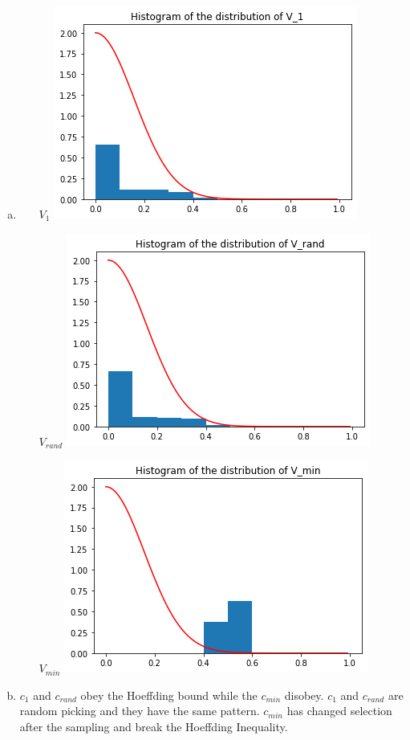 \documentclass{article}
\def\math#1{$#1$}
\begin{document}
\begin{enumerate}[a)]
    \item 
        \begin{itemize}
            \item [\math{V_1}] \includegraphics{1.10/5}
            \item [\math{V_{rand}}] \includegraphics{1.10/4}
            \item [\math{V_{min}}] \includegraphics{1.10/6}
        \end{itemize}
    \item \math{c_1} and \math{c_{rand}} obey the Hoeffding bound while the \math{c_{min}} disobey. \math{c_1} and \math{c_{rand}} are random picking and they have the same pattern. \math{c_{min}} has changed selection after the sampling and break the Hoeffding Inequality.

\end{enumerate}
\end{document}
